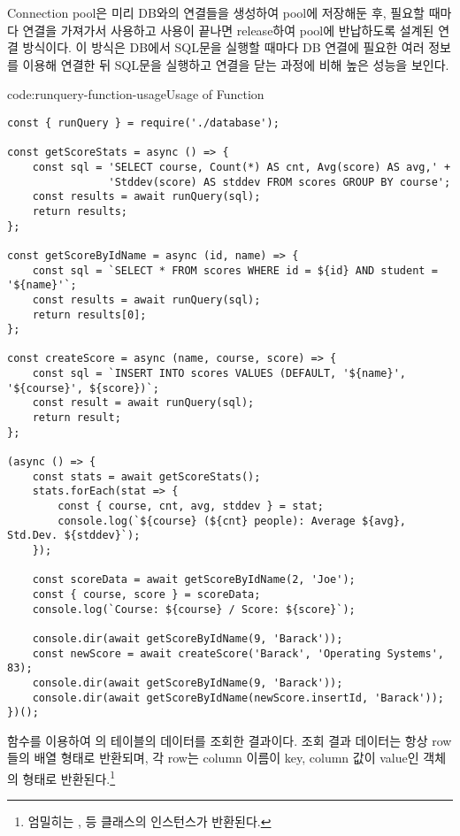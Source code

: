 Connection pool은 미리 DB와의 연결들을 생성하여 pool에 저장해둔 후, 필요할 때마다 연결을 가져가서 사용하고 사용이 끝나면 release하여 pool에 반납하도록 설계된 연결 방식이다. 이 방식은 DB에서 SQL문을 실행할 때마다 DB 연결에 필요한 여러 정보를 이용해 연결한 뒤 SQL문을 실행하고 연결을 닫는 과정에 비해 높은 성능을 보인다.

\begin{codeenv}{code:runquery-function-usage}{Usage of  Function}\begin{verbatim}
const { runQuery } = require('./database');

const getScoreStats = async () => {
    const sql = 'SELECT course, Count(*) AS cnt, Avg(score) AS avg,' +
                'Stddev(score) AS stddev FROM scores GROUP BY course';
    const results = await runQuery(sql);
    return results;
};

const getScoreByIdName = async (id, name) => {
    const sql = `SELECT * FROM scores WHERE id = ${id} AND student = '${name}'`;
    const results = await runQuery(sql);
    return results[0];
};

const createScore = async (name, course, score) => {
    const sql = `INSERT INTO scores VALUES (DEFAULT, '${name}', '${course}', ${score})`;
    const result = await runQuery(sql);
    return result;
};

(async () => {
    const stats = await getScoreStats();
    stats.forEach(stat => {
        const { course, cnt, avg, stddev } = stat;
        console.log(`${course} (${cnt} people): Average ${avg}, Std.Dev. ${stddev}`);
    });

    const scoreData = await getScoreByIdName(2, 'Joe');
    const { course, score } = scoreData;
    console.log(`Course: ${course} / Score: ${score}`);

    console.dir(await getScoreByIdName(9, 'Barack'));
    const newScore = await createScore('Barack', 'Operating Systems', 83);
    console.dir(await getScoreByIdName(9, 'Barack'));
    console.dir(await getScoreByIdName(newScore.insertId, 'Barack'));
})();
\end{verbatim}
\end{codeenv}

\는  함수를 이용하여 의  테이블의 데이터를 조회한 결과이다. 조회 결과 데이터는 항상 row들의 배열 형태로 반환되며, 각 row는 column 이름이 key, column 값이 value인 객체의 형태로 반환된다.\footnote{엄밀히는 ,  등 클래스의 인스턴스가 반환된다.}

